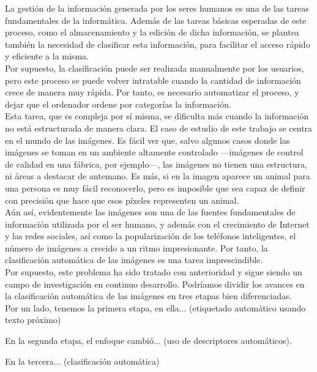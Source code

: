 La gestión de la información generada por los seres humanos es una de las tareas fundamentales de la informática. Además de las tareas básicas esperadas de este proceso, como el almacenamiento y la edición de dicha información, se plantea también la necesidad de clasificar esta información, para facilitar el acceso rápido y eficiente a la misma.\\

Por supuesto, la clasificación puede ser realizada manualmente por los usuarios, pero este proceso se puede volver intratable cuando la cantidad de información crece de manera muy rápida. Por tanto, es necesario automatizar el proceso, y dejar que el ordenador ordene por categorías la información.\\

Esta tarea, que es compleja por sí misma, se dificulta más cuando la información no está estructurada de manera clara. El caso de estudio de este trabajo se centra en el mundo de las imágenes. Es fácil ver que, salvo algunos casos donde las imágenes se toman en un ambiente altamente controlado ---imágenes de control de calidad en una fábrica, por ejemplo---, las imágenes no tienen una estructura, ni áreas a destacar de antemano. Es más, si en la imagen aparece un animal para una persona es muy fácil reconocerlo, pero es imposible que sea capaz de definir con precisión que hace que esos píxeles representen un animal.\\

Aún así, evidentemente las imágenes son una de las fuentes fundamentales de información utilizada por el ser humano, y además con el crecimiento de Internet y las redes sociales, así como la popularización de los teléfonos inteligentes, el número de imágenes a crecido a un ritmo impresionante. Por tanto, la clasificación automática de las imágenes es una tarea imprescindible.\\

Por supuesto, este problema ha sido tratado con anterioridad y sigue siendo un campo de investigación en continuo desarrollo. Podríamos dividir los avances en la clasificación automática de las imágenes en tres etapas bien diferenciadas.\\

Por un lado, tenemos la primera etapa, en ella... (etiquetado automático usando texto próximo)

En la segunda etapa, el enfoque cambió... (uso de descriptores automáticos).

En la tercera... (clasificación automática)


